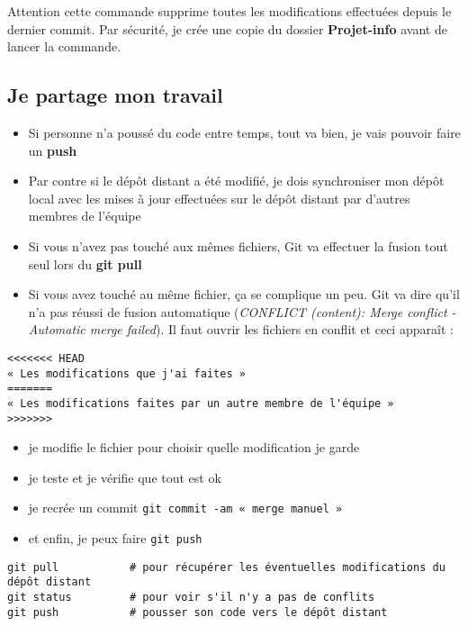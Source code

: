 \documentclass[11pt]{article}
\begin{document}
Attention cette commande supprime toutes les modifications effectuées depuis le dernier commit. Par sécurité, je crée une copie du dossier \textbf{Projet-info} avant de lancer la commande.



\subsection*{Je partage mon travail}

\begin{itemize}
    \item Si personne n'a poussé du code entre temps, tout va bien, je vais pouvoir faire un \textbf{push}
    \item Par contre si le dépôt distant a été modifié, je dois synchroniser mon dépôt local avec les mises à jour effectuées sur le dépôt distant par d'autres membres de l'équipe
    \item Si vous n'avez pas touché aux mêmes fichiers, Git va effectuer la fusion tout seul lors du \textbf{git pull}
    \item Si vous avez touché au même fichier, ça se complique un peu. Git va dire qu'il n'a pas réussi de fusion automatique (\textit{CONFLICT (content): Merge conflict - Automatic merge failed}). Il faut ouvrir les fichiers en conflit et ceci apparaît : 
\end{itemize}


\noindent
\verb"<<<<<<< HEAD" \\
\verb"« Les modifications que j'ai faites »" \\
\verb"=======" \\
\verb"« Les modifications faites par un autre membre de l'équipe »" \\
\verb">>>>>>>" \\

\begin{itemize}
    \item je modifie le fichier pour choisir quelle modification je garde
    \item je teste et je vérifie que tout est ok
    \item je recrée un commit \verb"git commit -am « merge manuel »"
    \item et enfin, je peux faire \verb"git push"
\end{itemize}

\noindent
\verb"git pull           # pour récupérer les éventuelles modifications du dépôt distant" \\
\verb"git status         # pour voir s'il n'y a pas de conflits" \\
\verb"git push           # pousser son code vers le dépôt distant" \\
\end{document}
